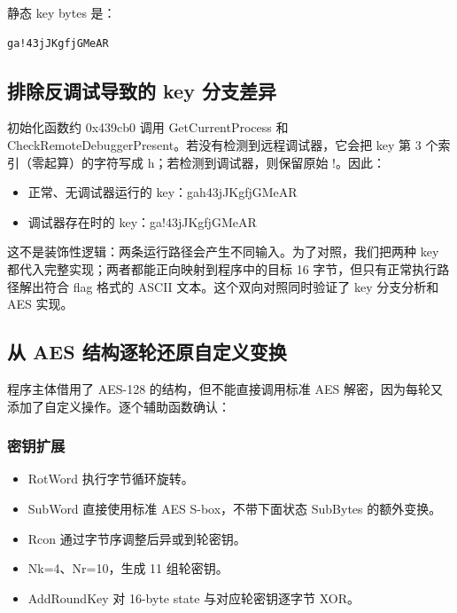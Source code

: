 静态 key bytes 是：

\begin{verbatim}
ga!43jJKgfjGMeAR
\end{verbatim}

\subsection{排除反调试导致的 key 分支差异}\label{ux6392ux9664ux53cdux8c03ux8bd5ux5bfcux81f4ux7684-key-ux5206ux652fux5deeux5f02}

初始化函数约 0x439cb0 调用 GetCurrentProcess 和 CheckRemoteDebuggerPresent。若没有检测到远程调试器，它会把 key 第 3 个索引（零起算）的字符写成 h；若检测到调试器，则保留原始 !。因此：

\begin{itemize}
\tightlist
\item
  正常、无调试器运行的 key：gah43jJKgfjGMeAR
\item
  调试器存在时的 key：ga!43jJKgfjGMeAR
\end{itemize}

这不是装饰性逻辑：两条运行路径会产生不同输入。为了对照，我们把两种 key 都代入完整实现；两者都能正向映射到程序中的目标 16 字节，但只有正常执行路径解出符合 flag 格式的 ASCII 文本。这个双向对照同时验证了 key 分支分析和 AES 实现。

\subsection{从 AES 结构逐轮还原自定义变换}\label{ux4ece-aes-ux7ed3ux6784ux9010ux8f6eux8fd8ux539fux81eaux5b9aux4e49ux53d8ux6362}

程序主体借用了 AES-128 的结构，但不能直接调用标准 AES 解密，因为每轮又添加了自定义操作。逐个辅助函数确认：

\subsubsection{密钥扩展}\label{ux5bc6ux94a5ux6269ux5c55}

\begin{itemize}
\tightlist
\item
  RotWord 执行字节循环旋转。
\item
  SubWord 直接使用标准 AES S-box，不带下面状态 SubBytes 的额外变换。
\item
  Rcon 通过字节序调整后异或到轮密钥。
\item
  Nk=4、Nr=10，生成 11 组轮密钥。
\item
  AddRoundKey 对 16-byte state 与对应轮密钥逐字节 XOR。
\end{itemize}

